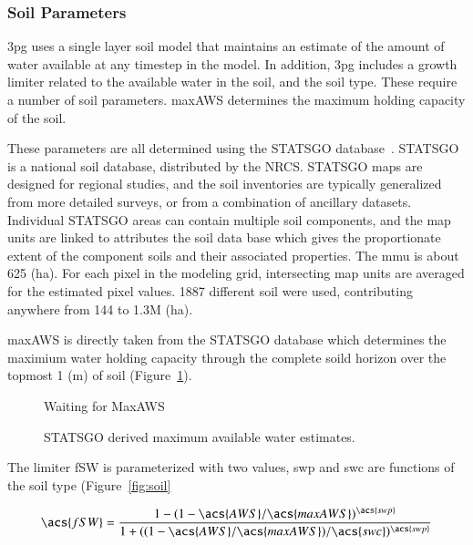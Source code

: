 \documentclass[preprint,12pt]{elsarticle}
\begin{document}
\subsubsection{Soil Parameters}
\label{sec:soil}

\ac{3pg} uses a single layer soil model that maintains an estimate of
the amount of water available at any timestep in the model.  In
addition, \ac{3pg} includes a growth limiter related to the available
water in the soil, and the soil type.  These require a number of soil
parameters.  \ac{maxAWS} determines the maximum holding capacity of
the soil.  

These parameters are all determined using the \acf{STATSGO}
database~\cite{SoilSurveyStaff2012-STATSGO}.  \ac{STATSGO} is a
national soil database, distributed by the \ac{NRCS}.  \ac{STATSGO}
maps are designed for regional studies, and the soil inventories are
typically generalized from more detailed surveys, or from a
combination of ancillary datasets.  Individual \ac{STATSGO} areas can
contain multiple soil components, and the map units are linked to
attributes the soil data base which gives the proportionate extent of
the component soils and their associated properties.  The \ac{mmu} is
about 625 (ha).  For each pixel in the modeling grid, intersecting map
units are averaged for the estimated pixel values.  1887 different
soil were used, contributing anywhere from 144 to 1.3M (ha).

\ac{maxAWS} is directly taken from the \ac{STATSGO} database which
determines the maximium water holding capacity through the complete
soild horizon over the topmost 1 (m) of soil (Figure~\ref{fig:aws}).

\begin{figure}
  \centering
  Waiting for MaxAWS
  \caption{\ac{STATSGO} derived maximum available water estimates. }
  \label{fig:aws}
\end{figure}

The limiter \ac{fSW} is parameterized with two values, \ac{swp} and
\ac{swc} are functions of the soil type (Figure~\ref{fig:soil}

\begin{equation*}
\acs{fSW} = \frac{1-(1-\acs{AWS}/\acs{maxAWS})^{\acs{swp}}}{1+((1-\acs{AWS}/\acs{maxAWS})/\acs{swc})^{\acs{swp}}}
\end{equation*} 
\end{document}
